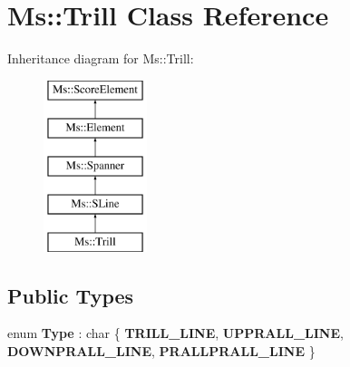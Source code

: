 \hypertarget{class_ms_1_1_trill}{}\section{Ms\+:\+:Trill Class Reference}
\label{class_ms_1_1_trill}
Inheritance diagram for Ms\+:\+:Trill\+:\begin{figure}[H]
\begin{center}
\leavevmode
\includegraphics[height=5.000000cm]{class_ms_1_1_trill}
\end{center}
\end{figure}
\subsection*{Public Types}
\begin{DoxyCompactItemize}
\item 
\mbox{\label{class_ms_1_1_trill_aa6ea2d22cc775c00edc1e83d3e67d039}} 
enum {\bfseries Type} \+: char \{ {\bfseries T\+R\+I\+L\+L\+\_\+\+L\+I\+NE}, 
{\bfseries U\+P\+P\+R\+A\+L\+L\+\_\+\+L\+I\+NE}, 
{\bfseries D\+O\+W\+N\+P\+R\+A\+L\+L\+\_\+\+L\+I\+NE}, 
{\bfseries P\+R\+A\+L\+L\+P\+R\+A\+L\+L\+\_\+\+L\+I\+NE}
 \}
\end{DoxyCompactItemize}
